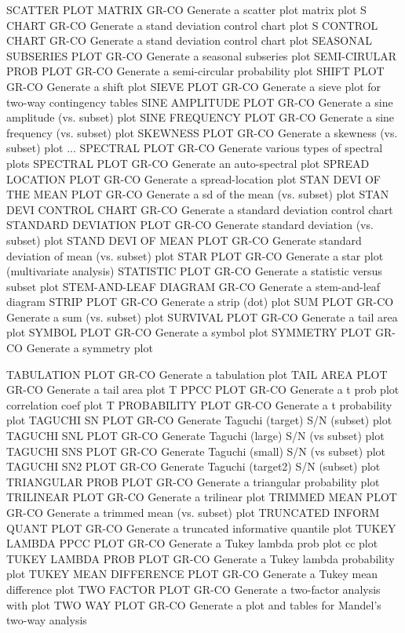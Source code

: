 SCATTER PLOT MATRIX         GR-CO Generate a scatter plot matrix plot
S CHART                     GR-CO Generate a stand deviation control chart plot
S CONTROL CHART             GR-CO Generate a stand deviation control chart plot
SEASONAL SUBSERIES PLOT     GR-CO Generate a seasonal subseries plot
SEMI-CIRULAR PROB PLOT      GR-CO Generate a semi-circular probability plot
SHIFT PLOT                  GR-CO Generate a shift plot
SIEVE PLOT                  GR-CO Generate a sieve plot for two-way contingency tables
SINE AMPLITUDE PLOT         GR-CO Generate a sine amplitude (vs. subset) plot
SINE FREQUENCY PLOT         GR-CO Generate a sine frequency (vs. subset) plot
SKEWNESS PLOT               GR-CO Generate a skewness (vs. subset) plot
... SPECTRAL PLOT           GR-CO Generate various types of spectral plots
SPECTRAL PLOT               GR-CO Generate an auto-spectral plot
SPREAD LOCATION PLOT        GR-CO Generate a spread-location plot
STAN DEVI OF THE MEAN PLOT  GR-CO Generate a sd of the mean (vs. subset) plot
STAN DEVI CONTROL CHART     GR-CO Generate a standard deviation control chart
STANDARD DEVIATION PLOT     GR-CO Generate standard deviation (vs. subset) plot
STAND DEVI OF MEAN PLOT     GR-CO Generate standard deviation of mean (vs. subset) plot
STAR PLOT                   GR-CO Generate a star plot (multivariate analysis)
STATISTIC PLOT              GR-CO Generate a statistic versus subset plot
STEM-AND-LEAF DIAGRAM       GR-CO Generate a stem-and-leaf diagram
STRIP PLOT                  GR-CO Generate a strip (dot) plot
SUM PLOT                    GR-CO Generate a sum (vs. subset) plot
SURVIVAL PLOT               GR-CO Generate a tail area plot
SYMBOL PLOT                 GR-CO Generate a symbol plot
SYMMETRY PLOT               GR-CO Generate a symmetry plot

TABULATION PLOT             GR-CO Generate a tabulation plot
TAIL AREA PLOT              GR-CO Generate a tail area plot
T PPCC PLOT                 GR-CO Generate a t prob plot correlation coef plot
T PROBABILITY PLOT          GR-CO Generate a t probability plot
TAGUCHI SN PLOT             GR-CO Generate Taguchi (target) S/N (subset) plot
TAGUCHI SNL PLOT            GR-CO Generate Taguchi (large) S/N (vs subset) plot
TAGUCHI SNS PLOT            GR-CO Generate Taguchi (small) S/N (vs subset) plot
TAGUCHI SN2 PLOT            GR-CO Generate Taguchi (target2) S/N (subset) plot
TRIANGULAR PROB PLOT        GR-CO Generate a triangular probability plot
TRILINEAR PLOT              GR-CO Generate a trilinear plot
TRIMMED MEAN PLOT           GR-CO Generate a trimmed mean (vs. subset) plot
TRUNCATED INFORM QUANT PLOT GR-CO Generate a truncated informative quantile plot
TUKEY LAMBDA PPCC PLOT      GR-CO Generate a Tukey lambda prob plot cc plot
TUKEY LAMBDA PROB PLOT      GR-CO Generate a Tukey lambda probability plot
TUKEY MEAN DIFFERENCE PLOT  GR-CO Generate a Tukey mean difference plot
TWO FACTOR PLOT             GR-CO Generate a two-factor analysis with plot
TWO WAY PLOT                GR-CO Generate a plot and tables for Mandel's two-way analysis

